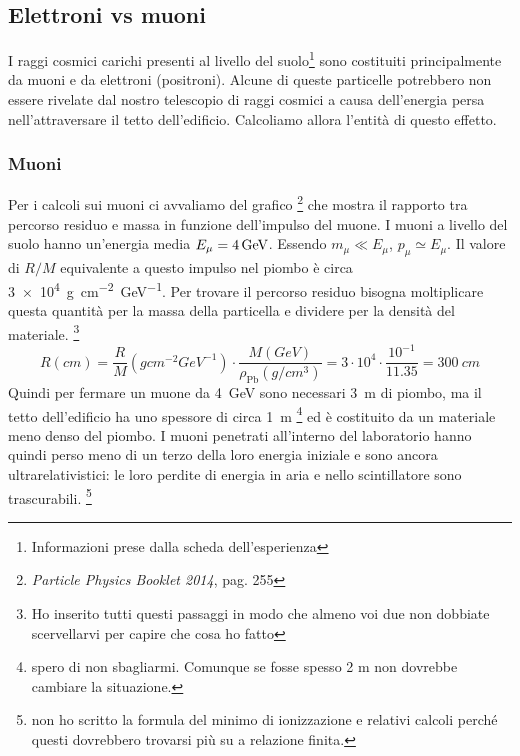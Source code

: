 \documentclass[a4paper]{article}
\begin{document}
  
\subsection*{Elettroni vs muoni}  %

I raggi cosmici carichi presenti al livello del suolo\footnote{Informazioni prese dalla scheda dell'esperienza} sono costituiti principalmente da muoni e da elettroni (positroni). Alcune di queste particelle potrebbero non essere rivelate dal nostro telescopio di raggi cosmici a causa dell'energia persa nell'attraversare il tetto dell'edificio. Calcoliamo allora l'entità di questo effetto.
\subsubsection*{Muoni} 
Per i calcoli sui muoni ci avvaliamo del grafico%
\footnote{\emph{Particle Physics Booklet 2014}, pag. 255}
che mostra il rapporto tra percorso residuo e massa in funzione dell'impulso del muone.
I muoni a livello del suolo hanno un'energia media $E_\mu=\SI4{GeV}$. Essendo $m_\mu \ll E_\mu$, $p_\mu \simeq E_\mu$. Il valore di $R/M$ equivalente a questo impulso nel piombo è circa \SI{3e4}{g cm^{-2} GeV^{-1}}. Per trovare il percorso residuo bisogna moltiplicare questa quantità per la massa della particella e dividere per la densità del materiale.
\footnote{Ho inserito tutti questi passaggi in modo che almeno voi due non dobbiate scervellarvi per capire che cosa ho fatto}
\begin{equation}
R(\si{cm})=\frac{R}{M} (\si{g cm^{-2} GeV^{-1}}) \cdot \frac{M(\si{GeV})}{\rho_{\text{Pb}} (\si{g/cm^3})}=3\cdot10^4 \cdot  \frac{10^{-1} }{11.35}=\SI{300}{cm}    
\end{equation}
Quindi per fermare un muone da \SI{4}{GeV} sono necessari \SI{3}{m} di piombo, ma il tetto dell'edificio ha uno spessore di circa \SI{1}{m}
\footnote{spero di non sbagliarmi. Comunque se fosse spesso 2 m non dovrebbe cambiare la situazione.} 
 ed è costituito da un materiale meno denso del piombo. I muoni penetrati all'interno del laboratorio hanno quindi perso meno di un terzo della loro energia iniziale e sono ancora ultrarelativistici: le loro perdite di energia in aria e nello scintillatore sono trascurabili. \footnote{non ho scritto la formula del minimo di ionizzazione e relativi calcoli perché questi dovrebbero trovarsi più su a relazione finita.}
\end{document}
